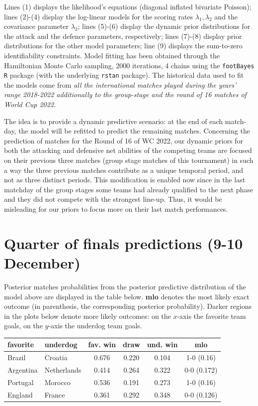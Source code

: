 \documentclass[
  10pt,
]{article}
\begin{document}
Lines (1) displays the likelihood's equations (diagonal inflated
bivariate Poisson); lines (2)-(4) display the log-linear models for the
scoring rates \(\lambda_{1}, \lambda_{2}\) and the covariance parameter
\(\lambda_3\); lines (5)-(6) display the dynamic prior distributions for
the attack and the defence parameters, respectively; lines (7)-(8)
display prior distributions for the other model parameters; line (9)
displays the sum-to-zero identifiability constraints. Model fitting has
been obtained through the Hamiltonian Monte Carlo sampling, 2000
iterations, 4 chains using the \texttt{footBayes} \texttt{R} package
(with the underlying \texttt{rstan} package). The historical data used
to fit the models come from \emph{all the international matches played
during the years' range 2018-2022 additionally to the group-stage and
the round of 16 matches of World Cup 2022}.

The idea is to provide a dynamic predictive scenario: at the end of each
match-day, the model will be refitted to predict the remaining matches.
Concerning the prediction of matches for the Round of 16 of WC 2022, our
dynamic priors for both the attacking and defensive net abilities of the
competing teams are focused on their previous three matches (group stage
matches of this tournament) in such a way the three previous matches
contribute as a unique temporal period, and not as three distinct
periods. This modification is enabled now since in the last matchday of
the group stages some teams had already qualified to the next phase and
they did not compete with the strongest line-up. Thus, it would be
misleading for our priors to focus more on their last match
performances.

\hypertarget{quarter-of-finals-predictions-9-10-december}{%
\section{Quarter of finals predictions (9-10
December)}\label{quarter-of-finals-predictions-9-10-december}}

Posterior matches probabilities from the posterior predictive
distribution of the model above are displayed in the table below.
\textbf{mlo} denotes the most likely exact outcome (in parenthesis, the
corresponding posterior probability). Darker regions in the plots below
denote more likely outcomes: on the \(x\)-axis the favorite team goals, on the
\(y\)-axis the underdog team goals.

\begin{longtable}[]{@{}llcccc@{}}
\toprule
favorite & underdog & fav. win & draw & und. win & mlo \\
\midrule
\endhead
Brazil & Croatia   &0.676  & 0.220 & 0.104 & 1-0 (0.16) \\
Argentina & Netherlands   & 0.414 &  0.264 & 0.322   & 0-0 (0.172) \\
Portugal & Morocco & 0.536  & 0.191 & 0.273   & 1-0 (0.16) \\
England & France & 0.361 & 0.292 & 0.348 & 0-0 (0.126) \\
\bottomrule
\end{longtable}
\end{document}
